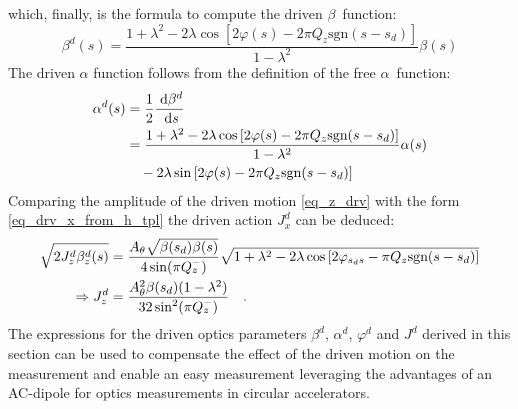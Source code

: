%
which, finally, is the formula to compute the driven $\beta$~function:
%
\begin{equation}
  \beta^d(s) =
  \frac{1+\lambda^2-2\lambda\cos\left[ 2\varphi(s) - 2\pi Q_z\text{sgn}(s-s_d)\right]}{1-\lambda^2}
  \beta(s)
\end{equation}
%
The driven $\alpha$ function follows from the definition of the free $\alpha$~function:
\begin{align}
  \alpha^d(s) &=  \frac{1}{2}\frac{\;\text{d} \beta^d}{\;\text{d} s}\notag \\
  &= 
  \frac{1+\lambda^2-2\lambda\cos\left[ 2\varphi(s) - 2\pi Q_z\text{sgn}(s-s_d)\right]}{1-\lambda^2}
  \alpha(s) \notag \\
  &\quad- 2\lambda \sin\left[ 2\varphi(s) - 2\pi Q_z\text{sgn}(s-s_d) \right]
  \label{eq_drv_alpha}
\end{align}
%
Comparing the amplitude of the driven motion \eqref{eq_z_drv} with the form \eqref{eq_drv_x_from_h_tpl}
the driven action $J_x^d$ can be deduced:
%
\begin{align}
  \sqrt{2J_z^d\beta_z^d(s)} &= 
  \frac{A_\theta\sqrt{\beta(s_d)\beta(s)}}{4\sin(\pi Q_z^-)}
  \sqrt{1+\lambda^2-2\lambda\cos\left[2\varphi_{s_ds} - \pi Q_z\text{sgn}(s-s_d)\right]} \notag \\
  \Rightarrow J_z^d &=  \frac{A_\theta^2\beta(s_d)(1-\lambda^2)}{32 \sin^2(\pi Q_z^-)}
  \quad .
  \label{eq_drv_Jy}
\end{align}
%
The expressions for the driven optics parameters $\beta^d$, $\alpha^d$, $\varphi^d$ and $J^d$ derived
in this section can be used to compensate the effect of the driven motion on the measurement and enable
an easy measurement leveraging the advantages of an AC-dipole for optics measurements in circular
accelerators.
